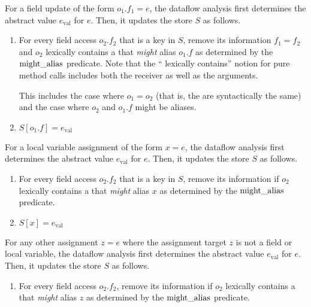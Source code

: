 
For a field update of the form $o_1.f_1 = e$, the
dataflow analysis first determines the abstract value $e_\text{val}$ for $e$.
Then, it updates the store $S$ as follows.
\begin{enumerate}
    \item For every field access $o_2.f_2$ that is a key in $S$, remove its
      information $f_1 = f_2$ and 
      $o_2$ lexically contains a  that \emph{might}
        alias $o_1.f$ as determined by the $\operatorname{might\_alias}$
        predicate.
      Note that the `` lexically contains'' notion for pure method calls
        includes both the receiver as well as the arguments.

      This includes the case where $o_1 = o_2$ (that is, the are
      syntactically the same) and the case where  $o_2$ and $o_1.f$ might be
      aliases.

    \item $S[o_1.f] = e_\text{val}$
\end{enumerate}



For a local variable assignment of the form $x = e$,
the dataflow analysis first determines the abstract value $e_\text{val}$ for
$e$.
Then, it updates the store $S$ as follows.
\begin{enumerate}
    \item For every field access $o_2.f_2$ that is a key in $S$, remove its information if
    $o_2$ lexically contains a  that \emph{might}
    alias $x$ as determined by the $\operatorname{might\_alias}$
    predicate.
    \item $S[x] = e_\text{val}$
\end{enumerate}


For any other assignment $z = e$ where the
assignment target $z$ is not a field or local variable,
the dataflow analysis first determines the abstract value $e_\text{val}$ for
$e$.
Then, it updates the store $S$ as follows.
\begin{enumerate}
    \item For every field access $o_2.f_2$, remove its information if
    $o_2$ lexically contains a  that \emph{might}
    alias $z$ as determined by the $\operatorname{might\_alias}$ predicate.
\end{enumerate}


